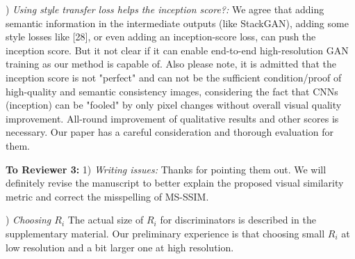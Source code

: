 \documentclass[10pt,twocolumn,letterpaper]{article}
\begin{document}
) \textit{Using style transfer loss helps the inception score?:} %
We agree that adding semantic information in the intermediate outputs (like StackGAN), adding some style losses like [28], or even adding an inception-score loss, can push the inception score. But it not clear if it can enable end-to-end high-resolution GAN training as our method is capable of.  Also please note, it is admitted that the inception score is not "perfect" and can not be the sufficient condition/proof of high-quality and semantic consistency images, considering the fact that CNNs (inception) can be "fooled" by only pixel changes without overall visual quality improvement.  All-round improvement of qualitative results and other scores is necessary. Our paper has a careful consideration and thorough evaluation for them.

\noindent
\textbf{To Reviewer 3:} 1) \textit{Writing issues:} Thanks for pointing them out. We will definitely revise the manuscript to better explain the proposed visual similarity metric and correct the misspelling of MS-SSIM.

) \textit{Choosing $R_i$} The actual size of $R_i$ for discriminators is described in the supplementary material. Our preliminary experience is that choosing small $R_i$ at low resolution and a bit larger one at high resolution.








%		

%
%
%
\end{document}
